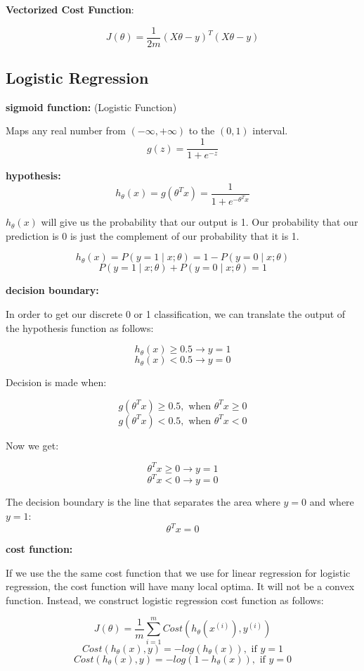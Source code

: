 \documentclass{article}
\begin{document}
\textbf{Vectorized Cost Function}:

\[J(\theta) = \frac{1}{2m} (X\theta - y)^T(X\theta - y)\]

\subsection{Logistic Regression}

\textbf{sigmoid function:} (Logistic Function)

Maps any real number from \((-\infty, +\infty)\) to the \((0, 1)\) interval.
\[g(z) = \frac{1}{1 + e^{-z}}\]

\textbf{hypothesis:}
\[
h_{\theta}(x) 
= g(\theta^T x)
= \frac{1}{1 + e^{-\theta^T x}}
\]

\(h_{\theta}(x)\) will give us the probability that our output is 1. Our probability that our prediction is 0 is just the complement of our probability that it is 1.

\[
h_{\theta} (x) 
= P(y = 1 \mid x ; \theta)
= 1 - P(y = 0 \mid x ; \theta)
\]
\[P(y = 1 \mid x ; \theta) + P(y = 0 \mid x ; \theta) = 1\]

\textbf{decision boundary:}

In order to get our discrete 0 or 1 classification, we can translate the output of the hypothesis function as follows:

\[h_{\theta} (x) \geq 0.5 \rightarrow y = 1\]
\[h_{\theta} (x) < 0.5 \rightarrow y = 0\]

Decision is made when:

\[g(\theta^T x) \geq 0.5, \text{ when } \theta^T x \geq 0\]
\[g(\theta^T x) < 0.5, \text{ when } \theta^T x < 0\]

Now we get:

\[\theta^T x \geq 0 \rightarrow y = 1\]
\[\theta^T x < 0 \rightarrow y = 0\]

The decision boundary is the line that separates the area where \(y = 0\) and where \(y = 1\):
\[\theta^T x = 0\]

\textbf{cost function:}

If we use the the same cost function that we use for linear regression for logistic regression, the cost function will have many local optima. It will not be a convex function. Instead, we construct logistic regression cost function as follows:

\[J(\theta) = \frac{1}{m} \sum_{i = 1}^m Cost(h_{\theta}(x^{(i)}), y^{(i)})\]
\[Cost(h_{\theta}(x), y) = -log(h_{\theta}(x)), \text{ if } y = 1\]
\[Cost(h_{\theta}(x), y) = -log(1 - h_{\theta}(x)), \text{ if } y = 0\]
\end{document}
